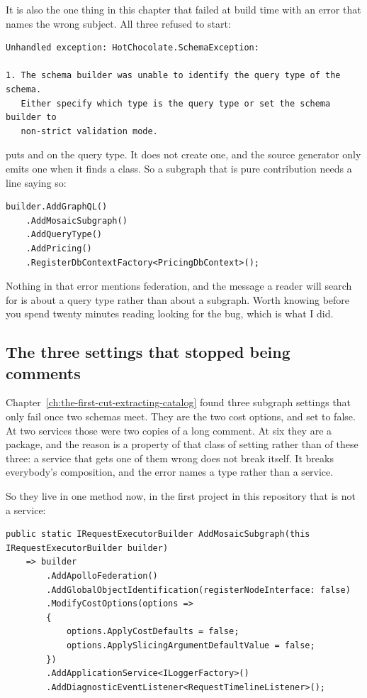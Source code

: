 It is also the one thing in this chapter that failed at build time with an error
that names the wrong subject. All three refused to start:

\begin{verbatim}
Unhandled exception: HotChocolate.SchemaException:

1. The schema builder was unable to identify the query type of the schema.
   Either specify which type is the query type or set the schema builder to
   non-strict validation mode.
\end{verbatim}

 puts  and  on the
query type. It does not create one, and the source generator only emits one when
it finds a \code{[QueryType]} class. So a subgraph that is pure contribution
needs a line saying so:

\begin{verbatim}
builder.AddGraphQL()
    .AddMosaicSubgraph()
    .AddQueryType()
    .AddPricing()
    .RegisterDbContextFactory<PricingDbContext>();
\end{verbatim}

Nothing in that error mentions federation, and the message a reader will search
for is about a query type rather than about a subgraph. Worth knowing before you
spend twenty minutes reading  looking for the bug,
which is what I did.

\subsection*{The three settings that stopped being comments}

%
Chapter~\ref{ch:the-first-cut-extracting-catalog} found three subgraph settings
that only fail once two schemas meet. They are the two cost options, and
 set to false. At two services those were two copies
of a long comment.
At six they are a package, and the reason is a property of that class of setting
rather than of these three: a service that gets one of them wrong does not break
itself. It breaks everybody's composition, and the error names a type rather
than a service.

So they live in one method now, in the first project in this repository that is
not a service:

\begin{verbatim}
public static IRequestExecutorBuilder AddMosaicSubgraph(this IRequestExecutorBuilder builder)
    => builder
        .AddApolloFederation()
        .AddGlobalObjectIdentification(registerNodeInterface: false)
        .ModifyCostOptions(options =>
        {
            options.ApplyCostDefaults = false;
            options.ApplySlicingArgumentDefaultValue = false;
        })
        .AddApplicationService<ILoggerFactory>()
        .AddDiagnosticEventListener<RequestTimelineListener>();
\end{verbatim}

